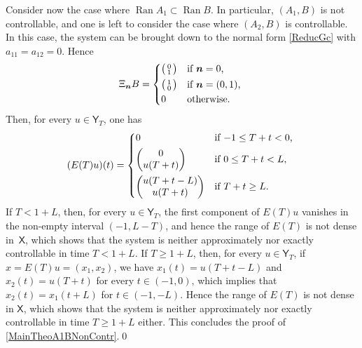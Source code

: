 \documentclass[10pt]{amsart}
\newcommand{\bn}{\boldsymbol{n}}
\newenvironment{smallpmatrix}{\big(\begin{smallmatrix}}{\end{smallmatrix}\big)}
\theoremstyle{plain}
\theoremstyle{definition}
\DeclareMathOperator{\range}{Ran}
\begin{document}
Consider now the case where $\range A_1 \subset \range B$. In particular, $(A_1, B)$ is not controllable, and one is left to consider the case where $(A_2, B)$ is controllable. In this case, the system can be brought down to the normal form \eqref{ReducGc} with $a_{11} = a_{12} = 0$. Hence
\begin{equation}%
\Xi_{\bn} B =
\begin{dcases*}
\begin{smallpmatrix}0 \\ 1 \\\end{smallpmatrix} & if $\bn = 0$, \\
\begin{smallpmatrix}1 \\ 0 \\\end{smallpmatrix} & if $\bn = (0, 1)$, \\
0 & otherwise.
\end{dcases*}
\end{equation}
Then, for every $u \in \mathsf Y_T$, one has
\begin{equation}
\label{Case3ExplicitE}
(E(T) u)(t) =
\begin{dcases*}
0 & if $-1 \leq T + t < 0$, \\
\begin{pmatrix}0 \\ u(T + t)\end{pmatrix} & if $0 \leq T + t < L$, \\
\begin{pmatrix} u(T + t - L) \\ u(T + t)\end{pmatrix} & if $T + t \geq L$.
\end{dcases*}
\end{equation}
If $T < 1 + L$, then, for every $u \in \mathsf Y_T$, the first component of $E(T) u$ vanishes in the non-empty interval $(-1, L - T)$, and hence the range of $E(T)$ is not dense in~$\mathsf X$, which shows that the system is neither approximately nor exactly controllable in time $T < 1 + L$. If $T \geq 1 + L$, then, for every $u \in \mathsf Y_T$, if $x = E(T) u = (x_1, x_2)$, we have $x_1(t) = u(T + t - L)$ and $x_2(t) = u(T + t)$ for every $t \in (-1, 0)$, which implies that $x_2(t) = x_1(t + L)$ for $t \in (-1, -L)$. Hence the range of $E(T)$ is not dense in $\mathsf X$, which shows that the system is neither approximately nor exactly controllable in time $T \geq 1 + L$ either. This concludes the proof of \eqref{MainTheoA1BNonContr}.\qed
\end{document}
